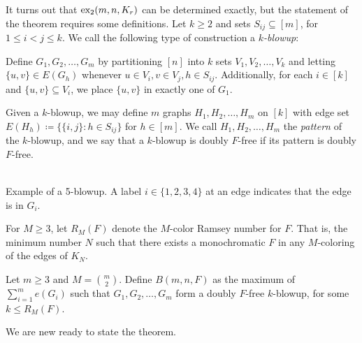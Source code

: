 \documentclass[10pt, reqno]{report}
\newcommand*{\dex}{\textnormal{ex}_2}
\begin{document}
It turns out that $\dex(m, n, K_r)$ can be determined exactly, but the statement of the theorem requires some definitions. Let $k \geq 2$ and sets $S_{ij} \subseteq [m]$, for $1 \leq i < j \leq k$. We call the following type of construction a \textit{$k$-blowup}: 

Define $G_1, G_2, \ldots, G_m$ by partitioning $[n]$ into $k$ sets $V_1, V_2, \ldots, V_k$ and letting $\{u, v\} \in E(G_h)$ whenever $u \in V_i, v \in V_j, h \in S_{ij}$. Additionally, for each $i \in [k]$ and $\{u, v\} \subseteq V_i$, we place $\{u, v\}$ in exactly one of $G_1$. 

Given a $k$-blowup, we may define $m$ graphs $H_1, H_2, \ldots, H_m$ on $[k]$ with edge set $E(H_h) \coloneq \{\{i, j\} : h \in S_{ij}\}$ for $h \in [m]$. We call $H_1, H_2, \ldots, H_m$ the \textit{pattern} of the $k$-blowup, and we say that a $k$-blowup is doubly $F$-free if its pattern is doubly $F$-free. 

\begin{center}
  \\
  \small{Example of a 5-blowup. A label $i \in \{1, 2, 3, 4\}$ at an edge indicates that the edge is in $G_i$.}
\end{center}

For $M \geq 3$, let $R_M(F)$ denote the $M$-color Ramsey number for $F$. That is, the minimum number $N$ such that there exists a monochromatic $F$ in any $M$-coloring of the edges of $K_N$.

Let $m \geq 3$ and $M = \binom{m}{2}$. Define $B(m, n, F)$ as the maximum of $\sum_{i = 1}^m e(G_i)$ such that $G_1, G_2, \ldots, G_m$ form a doubly $F$-free $k$-blowup, for some $k \leq R_M(F)$.

We are new ready to state the theorem.
\end{document}
